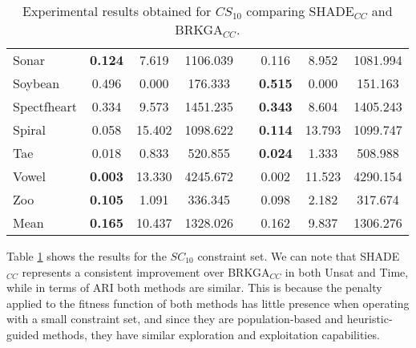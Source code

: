 \begin{table}[!h]
{\begin{tabular}{l ccc c ccc}
			Sonar & \textbf{0.124} & 7.619 & 1106.039 && 0.116 & 8.952 & 1081.994 \\
			Soybean & 0.496 & 0.000 & 176.333 && \textbf{0.515} & 0.000 & 151.163 \\
			Spectfheart & 0.334 & 9.573 & 1451.235 && \textbf{0.343} & 8.604 & 1405.243 \\
			Spiral & 0.058 & 15.402 & 1098.622 && \textbf{0.114} & 13.793 & 1099.747 \\
			Tae & 0.018 & 0.833 & 520.855 && \textbf{0.024} & 1.333 & 508.988 \\
			Vowel & \textbf{0.003} & 13.330 & 4245.672 && 0.002 & 11.523 & 4290.154 \\
			Zoo & \textbf{0.105} & 1.091 & 336.345 && 0.098 & 2.182 & 317.674 \\
			\hline
			Mean & \textbf{0.165} & 10.437 & 1328.026 && 0.162 & 9.837 & 1306.276 \\
			\hline
			
	\end{tabular}}
	
	\caption{Experimental results obtained for $CS_{10}$ comparing \acs{SHADE}$_{CC}$ and \acs{BRKGA}$_{CC}$.}
	\label{tab:resultsBRKGAvsSHADE10}
\end{table}

Table \ref{tab:resultsBRKGAvsSHADE10} shows the results for the $SC_{10}$ constraint set. We can note that \acs{SHADE}$_{CC}$ represents a consistent improvement over \acs{BRKGA}$_{CC}$ in both Unsat and Time, while in terms of \acs{ARI} both methods are similar. This is because the penalty applied to the fitness function of both methods has little presence when operating with a small constraint set, and since they are population-based and heuristic-guided methods, they have similar exploration and exploitation capabilities.

